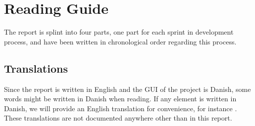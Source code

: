 
\section*{Reading Guide}
The report is splint into four parts, one part for each sprint in development process, and have been written in chronological order regarding this process. 

\subsection*{Translations}
\label{sub:translations}
Since the report is written in English and the GUI of the project is Danish, some words might be written in Danish when reading. If any element is written in Danish, we will provide an English translation for convenience, for instance . These translations are not documented anywhere other than in this report.
